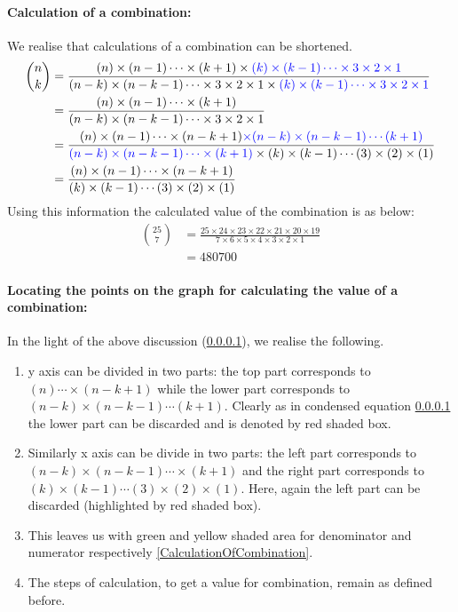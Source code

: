 \documentclass[10pt, twoside]{article}
\newcommand*{\Combination}[2]{\binom{#1}{#2}}%
\begin{document}
\paragraph{Calculation of a combination:}\label{ShortenedCalculation} We realise that calculations of a combination can be shortened.
\begin{align*}
 		\Combination{n}{k} &= \frac{(n)\times(n-1)\cdots\times(k+1)\times\color{blue}(k)\times(k-1)\cdots\times3\times2\times1}{(n-k)\times(n-k-1)\cdots\times3\times2\times1\times\color{blue}(k)\times(k-1)\cdots\times3\times2\times1}\\
 		&= \frac{(n)\times(n-1)\cdots\times(k+1)}{(n-k)\times(n-k-1)\cdots\times3\times2\times1}\\
 		&=\frac{(n)\times(n-1)\cdots\times(n-k+1){\color{blue}\times(n-k)\times(n-k-1)\cdots(k+1)}}{{\color{blue}(n-k)\times(n-k-1)\cdots\times(k+1)}\times(k)\times(k-1)\cdots(3)\times(2)\times(1)} \\
 		&=\frac{(n)\times(n-1)\cdots\times(n-k+1)}{(k)\times(k-1)\cdots(3)\times(2)\times(1)}
\end{align*}
Using this information the calculated value of the combination is as below:
\begin{align*}
	\Combination{25}{7} &= \frac{25\times24\times23\times22\times21\times20\times19}{7\times6\times5\times4\times3\times2\times1} \\
	&= 480700
\end{align*}
\paragraph{Locating the points on the graph for calculating the value of a combination:}In the light of the above discussion (\ref{ShortenedCalculation}), we realise the following. 
\begin{enumerate}
\item y axis can be divided in two parts: the top part corresponds to $(n)\cdots\times(n-k+1)$ while the lower part corresponds to $(n-k)\times(n-k-1)\cdots(k+1)$. Clearly as in condensed equation \ref{ShortenedCalculation} the lower part can be discarded and is denoted by red shaded box.
\item   Similarly x axis can be divide in two parts: the left part corresponds to $(n-k)\times(n-k-1)\cdots\times(k+1)$ and the right part corresponds to $(k)\times(k-1)\cdots(3)\times(2)\times(1)$. Here, again the left part can be discarded (highlighted by red shaded box). 
\item This leaves us with green and yellow shaded area for denominator and numerator respectively \ref{CalculationOfCombination}.
\item  The steps of calculation, to get a value for combination, remain as defined before.
\end{enumerate}
\end{document}
